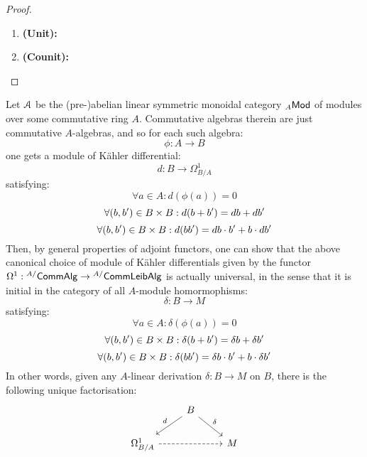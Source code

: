                         \begin{proof}
                            \noindent
                            \begin{enumerate}
                                \item \textbf{(Unit):} 
                                \item \textbf{(Counit):} 
                            \end{enumerate}
                        \end{proof}
                    \begin{corollary} \label{coro: kahler_differential_universal_property}
                        Let $\mathcal{A}$ be the (pre-)abelian linear symmetric monoidal category ${}_A\mathsf{Mod}$ of modules over some commutative ring $A$. Commutative algebras therein are just commutative $A$-algebras, and so for each such algebra:
                            $$\phi: A \to B$$
                        one gets a module of K\"ahler differential:
                            $$d: B \to \Omega^1_{B/A}$$
                        satisfying:
                            $$\forall a \in A: d\left(\phi(a)\right) = 0$$
                            $$\forall (b, b') \in B \x B: d(b + b') = db + db'$$
                            $$\forall (b, b') \in B \x B: d(bb') = db \cdot b' + b \cdot db'$$
                        Then, by general properties of adjoint functors, one can show that the above canonical choice of module of K\"ahler differentials given by the functor $\Omega^1: {}^{A/}\mathsf{Comm}\mathsf{Alg} \to {}^{A/}\mathsf{Comm}\mathsf{Leib}\mathsf{Alg}$ is actually universal, in the sense that it is initial in the category of all $A$-module homormophisms:
                            $$\delta: B \to M$$
                        satisfying:
                            $$\forall a \in A: \delta\left(\phi(a)\right) = 0$$
                            $$\forall (b, b') \in B \x B: \delta(b + b') = \delta b + \delta b'$$
                            $$\forall (b, b') \in B \x B: \delta(bb') = \delta b \cdot b' + b \cdot \delta b'$$
                        In other words, given any $A$-linear derivation $\delta: B \to M$ on $B$, there is the following unique factorisation:
                            $$
                                \begin{tikzcd}
                                	 & B \\
                                	{\Omega^1_{B/A}} && M
                                	\arrow["\delta", from=1-2, to=2-3]
                                	\arrow["d"', from=1-2, to=2-1]
                                	\arrow[dashed, from=2-1, to=2-3]
                                \end{tikzcd}
                            $$
                    \end{corollary}
                
